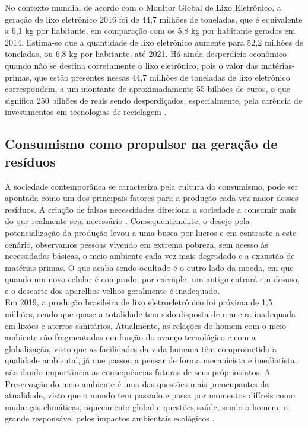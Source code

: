 \documentclass[
	12pt,				%
	openany,			%
	twoside,			%
	a4paper,			%
	english,			%
	french,				%
	spanish,			%
	brazil				%
	]{abntex2}
\begin{document}
No contexto mundial de acordo com o Monitor Global de Lixo Eletrônico, a geração de lixo eletrônico 2016 foi de 44,7 milhões de toneladas, que é equivalente a 6,1 kg por habitante, em comparação com os 5,8 kg por habitante gerados em 2014. Estima-se que a quantidade de lixo eletrônico aumente para 52,2 milhões de toneladas, ou 6,8 kg por habitante, até 2021. Há ainda desperdício econômico quando não se destina corretamente o lixo eletrônico, pois o valor  das matérias-primas, que estão presentes nessas 44,7 milhões de   toneladas de lixo eletrônico correspondem, a um montante de aproximadamente 55 bilhões de euros, o que significa 250 bilhões de  reais  sendo desperdiçados, especialmente, pela carência de investimentos em tecnologias de reciclagem \cite{dcfrjcvs}. 

\subsection{Consumismo como propulsor na geração de resíduos}
A sociedade contemporânea se caracteriza pela cultura do consumismo, pode ser apontada como um dos principais fatores para a produção cada vez maior desses resíduos. A criação de falsas necessidades direciona a sociedade a consumir mais do que realmente seja necessário \cite{vbd}.
Consequentemente, o desejo pela potencialização da produção levou a uma busca por lucros e em contraste a este cenário, observamos pessoas vivendo em extrema pobreza, sem acesso às necessidades básicas, o meio ambiente cada vez mais degradado e a exaustão de matérias primas. O que acaba sendo ocultado é o outro lado da moeda, em que quando um novo celular é comprado, por exemplo, um antigo entrará em desuso, e o descarte dos aparelhos velhos geralmente é inadequado.
\\
Em 2019, a produção brasileira de lixo eletroeletrônico foi próxima de 1,5 milhões, sendo que quase a totalidade tem sido disposta de maneira inadequada em lixões e aterros sanitários.
Atualmente, as relações do homem com o meio ambiente são fragmentadas em função do avanço tecnológico e com a globalização, visto que as facilidades da vida humana têm comprometido a qualidade ambiental, já que passou a pensar de forma mecanicista e imediatista, não dando importância as consequências futuras de seus próprios atos. A Preservação do meio ambiente é uma das questões mais preocupantes da atualidade, visto que o mundo tem passado e passa por momentos difíceis como mudanças climáticas, aquecimento global e questões saúde, sendo o homem, o grande responsável pelos impactos ambientais ecológicos \cite{ess}.
\end{document}
